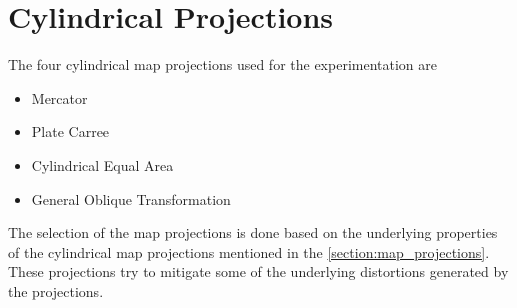 
\section{Cylindrical Projections}

The four cylindrical map projections used for the experimentation are
\begin{itemize}
    \item Mercator
    \item Plate Carree
    \item Cylindrical Equal Area
    \item General Oblique Transformation
\end{itemize}
The selection of the map projections is done based on the underlying properties of the cylindrical map projections mentioned in the \autoref{section:map_projections}. These projections try to mitigate some of the underlying distortions generated by the projections.

